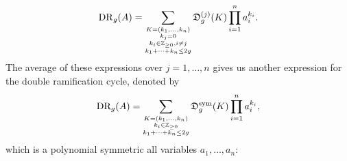 \documentclass{amsart}
\numberwithin{equation}{section} %
\theoremstyle{plain}
\theoremstyle{remark}
\begin{document}
\begin{equation}
\label{eq:nonSymmetricPolyDR}
	\operatorname{DR}_{g}(A)=\sum_{\footnotesize\substack{K=(k_1,\dots,k_n) \\ k_j = 0 \\ k_i \in \mathbb{Z}_{\geq 0}, i\not=j \\ k_1+\cdots+k_n\leq 2g}} \mathfrak{D}^{(j)}_{g}(K)\prod_{i=1}^n a_i^{k_i}.
\end{equation}
The average of these expressions over $j=1,\dots,n$ gives us another expression for the double ramification cycle, denoted by
\begin{equation} \label{eq:SYmmetricPolynomialDR}
	\textrm{DR}_{g}(A)=\sum_{\footnotesize\substack{K=(k_1,\dots,k_n) \\ k_i \in \mathbb{Z}_{\geq 0} \\ k_1+\cdots+k_n\leq 2g}} \mathfrak{D}^{\mathrm{sym}}_{g}(K)\prod_{i=1}^n a_i^{k_i},
\end{equation}
which is a polynomial symmetric all variables $a_1,\dots,a_n$: 
﻿
﻿
\end{document}
